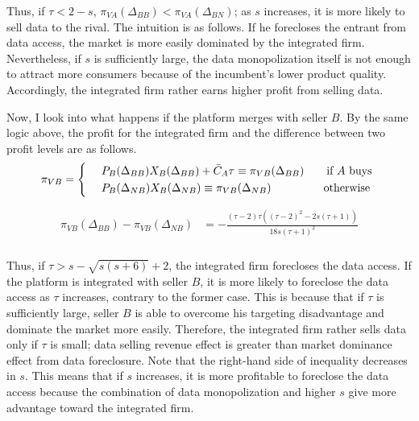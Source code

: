 \documentclass[12pt]{article}
\begin{document}
Thus, if $\tau<2-s$, $\pi_{VA}(\Delta_{BB})<\pi_{VA}(\Delta_{BN})$; as $s$ increases, it is more likely to sell data to the rival. The intuition is as follows. If he forecloses the entrant from data access, the market is more easily dominated by the integrated firm. Nevertheless, if $s$ is sufficiently large, the data monopolization itself is not enough to attract more consumers because of the incumbent's lower product quality. Accordingly, the integrated firm rather earns higher profit from selling data. 


Now, I look into what happens if the platform merges with seller $B$. By the same logic above, the profit for the integrated firm and the difference between two profit levels are as follows. 
\begin{align}
\begin{aligned}
\pi_{VB}=\begin{dcases}
&\,\,  P_B(\Delta_{BB})X_B(\Delta_{BB})+\bar{C}_A\tau\equiv \pi_{VB}(\Delta_{BB})  \quad \quad  \text{if $A$ buys }  \\
&\,\,  P_B(\Delta_{NB})X_B(\Delta_{NB}) \equiv \pi_{VB}(\Delta_{NB}) \quad\quad\quad\quad\,\,\,\,   \text{otherwise} 
\end{dcases}\end{aligned}
\end{align}
\begin{align}\label{VBprofitcomparison}
\begin{aligned}
\pi_{VB}(\Delta_{BB})-\pi_{VB}(\Delta_{NB}) &= -\frac{(\tau -2) \tau  \left((\tau -2)^2-2 s (\tau +1)\right)}{18 s (\tau +1)^2}\\
\end{aligned}
\end{align}

Thus, if $\tau>s-\sqrt{s (s+6)}+2$, the integrated firm forecloses the data access. If the platform is integrated with seller $B$, it is more likely to foreclose the data access as $\tau$ increases, contrary to the former case. This is because that if $\tau$ is sufficiently large, seller $B$ is able to overcome his targeting disadvantage and dominate the market more easily. Therefore, the integrated firm rather sells data only if $\tau$ is small; data selling revenue effect is greater than market dominance effect from data foreclosure. Note that the right-hand side of inequality decreases in $s$. This means that if $s$ increases, it is more profitable to foreclose the data access because the combination of data monopolization and higher $s$ give more advantage toward the integrated firm. 
\end{document}
